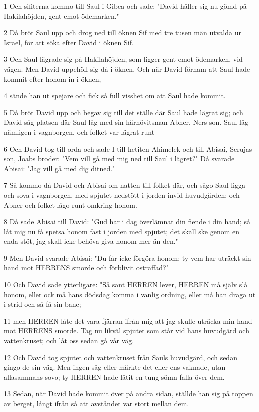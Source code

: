 \par 1 Och sifiterna kommo till Saul i Gibea och sade: "David håller sig nu gömd på Hakilahöjden, gent emot ödemarken."
\par 2 Då bröt Saul upp och drog ned till öknen Sif med tre tusen män utvalda ur Israel, för att söka efter David i öknen Sif.
\par 3 Och Saul lägrade sig på Hakilahöjden, som ligger gent emot ödemarken, vid vägen. Men David uppehöll sig då i öknen. Och när David förnam att Saul hade kommit efter honom in i öknen,
\par 4 sände han ut spejare och fick så full visshet om att Saul hade kommit.
\par 5 Då bröt David upp och begav sig till det ställe där Saul hade lägrat sig; och David såg platsen där Saul låg med sin härhövitsman Abner, Ners son. Saul låg nämligen i vagnborgen, och folket var lägrat runt
\par 6 Och David tog till orda och sade I till hetiten Ahimelek och till Abisai, Serujas son, Joabs broder: "Vem vill gå med mig ned till Saul i lägret?" Då svarade Abisai: "Jag vill gå med dig ditned."
\par 7 Så kommo då David och Abisai om natten till folket där, och sågo Saul ligga och sova i vagnborgen, med spjutet nedstött i jorden invid huvudgärden; och Abner och folket lågo runt omkring honom.
\par 8 Då sade Abisai till David: "Gud har i dag överlämnat din fiende i din hand; så låt mig nu få spetsa honom fast i jorden med spjutet; det skall ske genom en enda stöt, jag skall icke behöva giva honom mer än den."
\par 9 Men David svarade Abisai: "Du får icke förgöra honom; ty vem har uträckt sin hand mot HERRENS smorde och förblivit ostraffad?"
\par 10 Och David sade ytterligare: "Så sant HERREN lever, HERREN må själv slå honom, eller ock må hans dödsdag komma i vanlig ordning, eller må han draga ut i strid och så få sin bane;
\par 11 men HERREN låte det vara fjärran ifrån mig att jag skulle uträcka min hand mot HERRENS smorde. Tag nu likväl spjutet som står vid hans huvudgärd och vattenkruset; och låt oss sedan gå vår väg.
\par 12 Och David tog spjutet och vattenkruset från Sauls huvudgärd, och sedan gingo de sin väg. Men ingen såg eller märkte det eller ens vaknade, utan allasammans sovo; ty HERREN hade låtit en tung sömn falla över dem.
\par 13 Sedan, när David hade kommit över på andra sidan, ställde han sig på toppen av berget, långt ifrån så att avståndet var stort mellan dem.
